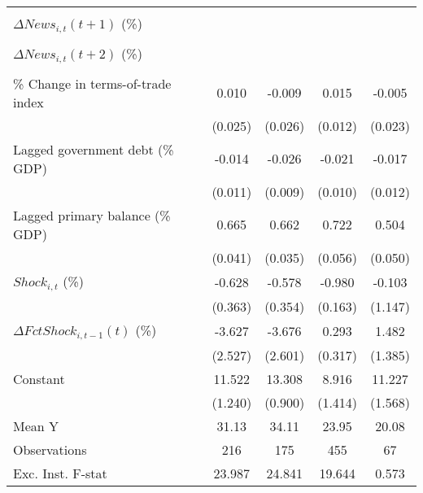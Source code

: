 {\begin{tabular}{l*{4}{c}}
                    &                     &                     &                     &                     \\
\addlinespace
$ \Delta News_{i,t}(t+1)$ (\%)&                     &                     &                     &                     \\
                    &                     &                     &                     &                     \\
\addlinespace
$ \Delta News_{i,t}(t+2)$ (\%)&                     &                     &                     &                     \\
                    &                     &                     &                     &                     \\
\addlinespace
\% Change in terms-of-trade index&       0.010         &      -0.009         &       0.015         &      -0.005         \\
                    &     (0.025)         &     (0.026)         &     (0.012)         &     (0.023)         \\
\addlinespace
Lagged government debt (\% GDP)&      -0.014         &      -0.026\sym{**} &      -0.021\sym{**} &      -0.017         \\
                    &     (0.011)         &     (0.009)         &     (0.010)         &     (0.012)         \\
\addlinespace
Lagged primary balance (\% GDP)&       0.665\sym{***}&       0.662\sym{***}&       0.722\sym{***}&       0.504\sym{***}\\
                    &     (0.041)         &     (0.035)         &     (0.056)         &     (0.050)         \\
\addlinespace
$ Shock_{i,t}$ (\%) &      -0.628         &      -0.578         &      -0.980\sym{***}&      -0.103         \\
                    &     (0.363)         &     (0.354)         &     (0.163)         &     (1.147)         \\
\addlinespace
$ \Delta FctShock_{i,t-1}(t)$ (\%)&      -3.627         &      -3.676         &       0.293         &       1.482         \\
                    &     (2.527)         &     (2.601)         &     (0.317)         &     (1.385)         \\
\addlinespace
Constant            &      11.522\sym{***}&      13.308\sym{***}&       8.916\sym{***}&      11.227\sym{***}\\
                    &     (1.240)         &     (0.900)         &     (1.414)         &     (1.568)         \\
\midrule
Mean Y              &       31.13         &       34.11         &       23.95         &       20.08         \\
Observations        &         216         &         175         &         455         &          67         \\
Exc. Inst. F-stat   &      23.987         &      24.841         &      19.644         &       0.573         \\
\bottomrule
\end{tabular}
}
